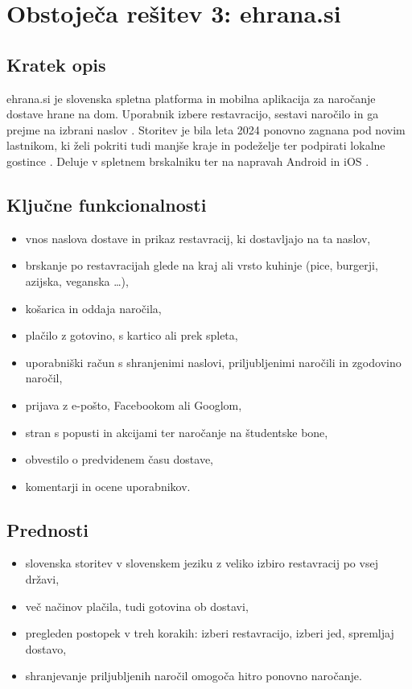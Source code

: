 \documentclass[12pt,a4paper]{article}
\begin{document}
\section*{Obstoječa rešitev 3: ehrana.si}

\subsection*{Kratek opis}
ehrana.si je slovenska spletna platforma in mobilna aplikacija za naročanje
dostave hrane na dom. Uporabnik izbere restavracijo, sestavi naročilo in ga
prejme na izbrani naslov \cite{ehrana}. Storitev je bila leta 2024 ponovno
zagnana pod novim lastnikom, ki želi pokriti tudi manjše kraje in podeželje
ter podpirati lokalne gostince \cite{ehrana24ur}. Deluje v spletnem
brskalniku ter na napravah Android in iOS \cite{ehranaApp}.

\subsection*{Ključne funkcionalnosti}
\begin{itemize}
  \item vnos naslova dostave in prikaz restavracij, ki dostavljajo na ta naslov,
  \item brskanje po restavracijah glede na kraj ali vrsto kuhinje (pice, burgerji, azijska, veganska \dots),
  \item košarica in oddaja naročila,
  \item plačilo z gotovino, s kartico ali prek spleta,
  \item uporabniški račun s shranjenimi naslovi, priljubljenimi naročili in zgodovino naročil,
  \item prijava z e-pošto, Facebookom ali Googlom,
  \item stran s popusti in akcijami ter naročanje na študentske bone,
  \item obvestilo o predvidenem času dostave,
  \item komentarji in ocene uporabnikov.
\end{itemize}

\subsection*{Prednosti}
\begin{itemize}
  \item slovenska storitev v slovenskem jeziku z veliko izbiro restavracij po vsej državi,
  \item več načinov plačila, tudi gotovina ob dostavi,
  \item pregleden postopek v treh korakih: izberi restavracijo, izberi jed, spremljaj dostavo,
  \item shranjevanje priljubljenih naročil omogoča hitro ponovno naročanje.
\end{itemize}
\end{document}

